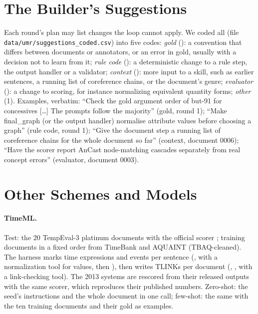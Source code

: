 \section{The Builder's Suggestions}
\label{app:suggestions}

Each round's plan may list changes the loop cannot apply. We coded all \nSuggestions{} (file \texttt{data/umr/suggestions\_coded.csv}) into five codes: \emph{gold} (\sugGold): a convention that differs between documents or annotators, or an error in gold, usually with a decision not to learn from it; \emph{rule code} (\sugRule): a deterministic change to a rule step, the output handler or a validator; \emph{context} (\sugContext): more input to a skill, such as earlier sentences, a running list of coreference chains, or the document's genre; \emph{evaluator} (\sugEval): a change to scoring, for instance normalizing equivalent quantity forms; \emph{other} (1). Examples, verbatim: ``Check the gold argument order of but-91 for concessives [\ldots] The prompts follow the majority'' (gold, round 1); ``Make final\_graph (or the output handler) normalise attribute values before choosing a graph'' (rule code, round 1); ``Give the document step a running list of coreference chains for the whole document so far'' (context, document 0006); ``Have the scorer report AnCast node-matching cascades separately from real concept errors'' (evaluator, document 0003). 

\section{Other Schemes and Models}
\label{app:other}




\paragraph{TimeML.} Test: the 20 TempEval-3 platinum documents with the official scorer \citep{uzzaman2013semeval}; training documents in a fixed order from TimeBank and AQUAINT (TBAQ-cleaned). The harness marks time expressions and events per sentence (, with a normalization tool for values, then ), then writes TLINKs per document (, , with a link-checking tool). The 2013 systems are rescored from their released outputs with the same scorer, which reproduces their published numbers. Zero-shot: the seed's instructions and the whole document in one call; few-shot: the same with the ten training documents and their gold as examples.

